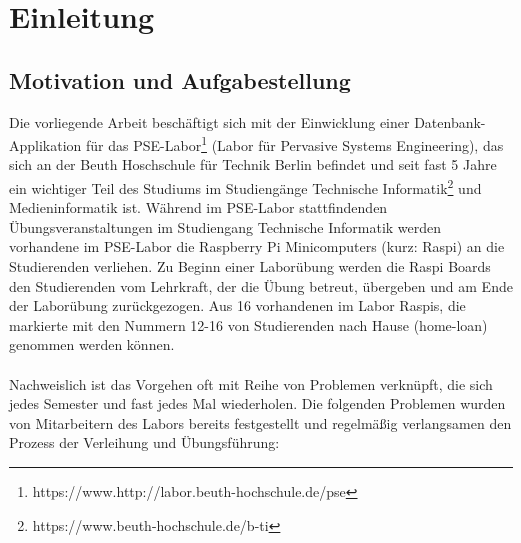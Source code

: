 \chapter{Einleitung}
\label{sec:intro}
\section{Motivation und Aufgabestellung}
\label{sec:intro:motivation}
Die vorliegende Arbeit beschäftigt sich mit der Einwicklung einer Datenbank-Applikation für das PSE-Labor\footnote{https://www.http://labor.beuth-hochschule.de/pse} (Labor für Pervasive Systems Engineering), das sich an der Beuth Hoschschule für Technik Berlin befindet und seit fast 5 Jahre ein wichtiger Teil des Studiums im Studiengänge Technische Informatik\footnote{https://www.beuth-hochschule.de/b-ti} und Medieninformatik ist. Während im PSE-Labor stattfindenden Übungsveranstaltungen im Studiengang Technische Informatik werden vorhandene im PSE-Labor die Raspberry Pi Minicomputers (kurz: Raspi)  an die Studierenden verliehen. Zu Beginn einer Laborübung werden die Raspi Boards den Studierenden vom Lehrkraft, der die Übung betreut, übergeben und am Ende der Laborübung zurückgezogen. Aus 16 vorhandenen im Labor Raspis, die markierte mit den Nummern 12-16 von Studierenden nach Hause (home-loan) genommen werden können.\\\\
Nachweislich ist das Vorgehen oft mit Reihe von Problemen verknüpft, die sich jedes Semester und fast jedes Mal wiederholen. Die folgenden Problemen wurden von Mitarbeitern des Labors bereits festgestellt und regelmäßig verlangsamen den Prozess der Verleihung und Übungsführung: 
